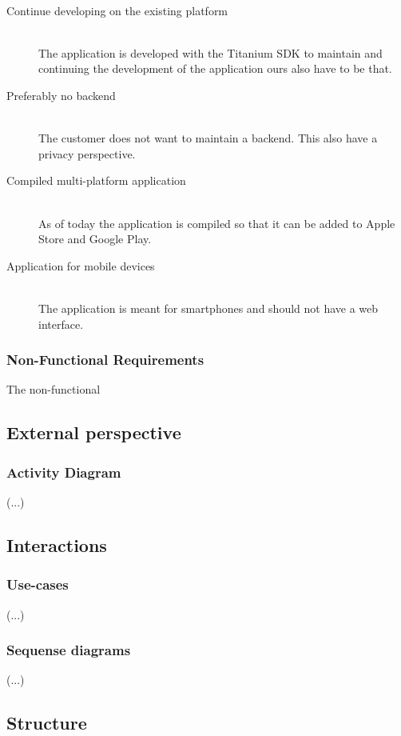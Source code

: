 \documentclass[12pt,a4paper,titlepage]{article}
\begin{document}
					\paragraph{}
						
					\begin{description}
						\item[Continue developing on the existing platform] \hfill \\
						The application is developed with the Titanium SDK to maintain and continuing the development of the application ours also have to be that.
						\item[Preferably no backend] \hfill \\
						The customer does not want to maintain a backend. This also have a privacy perspective. 
						\item[Compiled multi-platform application]  \hfill \\
						As of today the application is compiled so that it can be added to Apple Store and Google Play.
						\item[Application for mobile devices]  \hfill \\
						The application is meant for smartphones and should not have a web interface.
					\end{description}			
				\subsubsection{Non-Functional Requirements}
The non-functional 
					

			\subsection{External perspective}
				\subsubsection{Activity Diagram}
(...)
			\subsection{Interactions}
				\subsubsection{Use-cases}
(...)
				\subsubsection{Sequense diagrams}
(...)
			\subsection{Structure}
\end{document}
